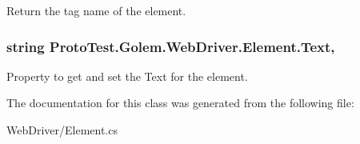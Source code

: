 Return the tag name of the element. 

\hypertarget{class_proto_test_1_1_golem_1_1_web_driver_1_1_element_af3b6f6f3e2afdd7d5e08c25dd516220f}{
\subsubsection[{Text}]{\setlength{\rightskip}{0pt plus 5cm}string Proto\-Test.\-Golem.\-Web\-Driver.\-Element.\-Text\hspace{0.3cm}{\ttfamily [get]}, {\ttfamily [set]}}}\label{class_proto_test_1_1_golem_1_1_web_driver_1_1_element_af3b6f6f3e2afdd7d5e08c25dd516220f}


Property to get and set the Text for the element. 



The documentation for this class was generated from the following file\-:\begin{DoxyCompactItemize}
\item 
Web\-Driver/Element.\-cs\end{DoxyCompactItemize}
